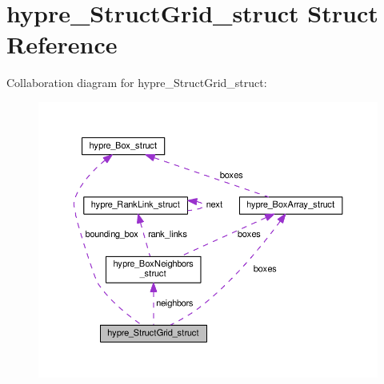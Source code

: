 \hypertarget{structhypre__StructGrid__struct}{}\section{hypre\+\_\+\+Struct\+Grid\+\_\+struct Struct Reference}
\label{structhypre__StructGrid__struct}


Collaboration diagram for hypre\+\_\+\+Struct\+Grid\+\_\+struct\+:
\nopagebreak
\begin{figure}[H]
\begin{center}
\leavevmode
\includegraphics[width=350pt]{structhypre__StructGrid__struct__coll__graph}
\end{center}
\end{figure}
